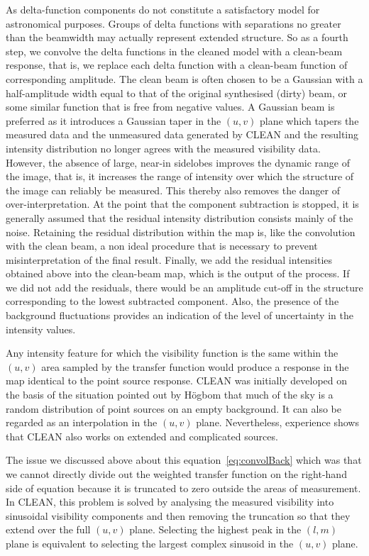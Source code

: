 As delta-function components do not constitute a satisfactory model for astronomical purposes. Groups of delta functions with separations no greater than the beamwidth may actually represent extended structure. So as a fourth step, we convolve the delta functions in the cleaned model with a clean-beam response, that is, we replace each delta function with a clean-beam function of corresponding amplitude. The clean beam is often chosen to be a Gaussian with a half-amplitude width equal to that of the original synthesised (dirty) beam, or some similar function that is free from negative values. A Gaussian beam is preferred as it introduces a Gaussian taper in the $(u,v)$ plane which tapers the measured data and the unmeasured data generated by CLEAN and the resulting intensity distribution no longer agrees with the measured visibility data. However, the absence of large, near-in sidelobes improves the dynamic range of the image, that is, it increases the range of intensity over which the structure of the image can reliably be measured. This thereby also removes the danger of over-interpretation. At the point that the component subtraction is stopped, it is generally assumed that the residual intensity distribution consists mainly of the noise. Retaining the residual distribution within the map is, like the convolution with the clean beam, a non ideal procedure that is necessary to prevent misinterpretation of the final result. Finally, we add the residual intensities obtained above into the clean-beam map, which is the output of the process. If we did not add the residuals, there would be an amplitude cut-off in the structure corresponding to the lowest subtracted component. Also, the presence of the background fluctuations provides an indication of the level of uncertainty in the intensity values.

Any intensity feature for which the visibility function is the same within the $(u,v)$ area sampled by the transfer function would produce a response in the map identical to the point source response. CLEAN was initially developed on the basis of the situation pointed out by Högbom that much of the sky is a random distribution of point sources on an empty background. It can also be regarded as an interpolation in the $(u,v)$ plane. Nevertheless, experience shows that CLEAN also works on extended and complicated sources.
 
The issue we discussed above about this equation~\ref{eq:convolBack} which was that we cannot directly divide out the weighted transfer function on the right-hand side of equation because it is truncated to zero outside the areas of measurement. In CLEAN, this problem is solved by analysing the measured visibility into sinusoidal visibility components and then removing the truncation so that they extend over the full $(u,v)$ plane. Selecting the highest peak in the $(l, m )$ plane is equivalent to selecting the largest complex sinusoid in the $(u,v)$ plane.

